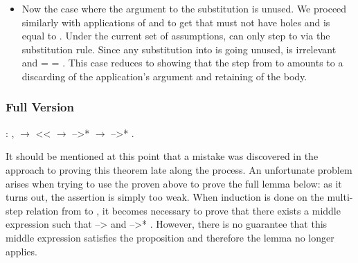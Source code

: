 \documentclass[12pt]{report}
\begin{document}
\begin{itemize}
\begin{itemize}
\item  Now the case where the argument to the substitution is
      unused. We proceed similarly with applications of
       and  to get that
       must not have holes and is equal to . Under the
      current set of assumptions,  can only step to  via the
      substitution rule. Since any substitution into  is
      going unused,  is irrelevant and  = 
      = . This case reduces to showing that the step from  to
       amounts to a discarding of the application's argument and
      retaining of the body. 

\end{itemize}

\end{itemize}


\subsubsection{Full Version}

\begin{coqdoccode}
\coqdocemptyline
\coqdocindent{1.00em}
  : \coqdockw{\ensuremath{\forall}}   ,\coqdoceol
\coqdocindent{2.00em}
  \ensuremath{\rightarrow}\coqdoceol
\coqdocindent{2.00em}
 <<  \ensuremath{\rightarrow}\coqdoceol
\coqdocindent{2.00em}
 -->*  \ensuremath{\rightarrow}\coqdoceol
\coqdocindent{2.00em}
 -->* .\coqdoceol
\coqdocemptyline
\end{coqdoccode}
It should be mentioned at this point that a mistake was
discovered in the approach to proving this theorem late along the
process. An unfortunate problem arises when trying to use the
 proven above to prove the full
 lemma below: as it turns out, the assertion is simply
too weak. When induction is done on the multi-step relation from 
to , it becomes necessary to prove that there exists a middle
expression  such that  -->  and  -->* . However, there is
no guarantee that this middle expression satisfies the 
proposition and therefore the  lemma no
longer applies. 
\end{document}
